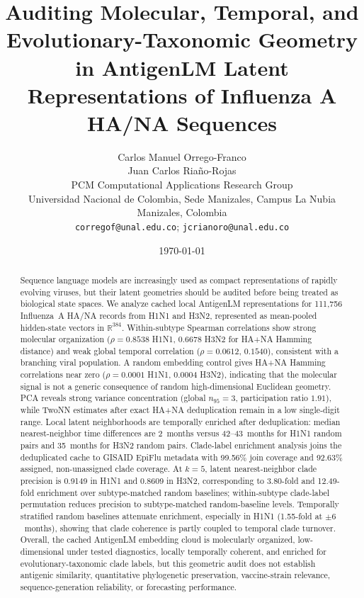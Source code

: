 \documentclass[11pt]{article}
\title{Auditing Molecular, Temporal, and Evolutionary-Taxonomic Geometry in AntigenLM Latent Representations of Influenza A HA/NA Sequences}
\author{
Carlos Manuel Orrego-Franco\\
Juan Carlos Riaño-Rojas\\
\vspace{0.4em}
\small PCM Computational Applications Research Group\\
\small Universidad Nacional de Colombia, Sede Manizales, Campus La Nubia\\
\small Manizales, Colombia\\
\small \texttt{corregof@unal.edu.co}; \texttt{jcrianoro@unal.edu.co}
}
\date{\today}
\newcommand{\R}{\mathbb{R}}
\begin{document}
\maketitle

\begin{abstract}
Sequence language models are increasingly used as compact representations
of rapidly evolving viruses, but their latent geometries should be audited
before being treated as biological state spaces. We analyze cached local
AntigenLM representations for 111,756 Influenza~A HA/NA records from H1N1
and H3N2, represented as mean-pooled hidden-state vectors in $\R^{384}$.
Within-subtype Spearman correlations show strong molecular organization
($\rho = 0.8538$ H1N1, $0.6678$ H3N2 for HA+NA Hamming distance) and
weak global temporal correlation ($\rho = 0.0612$, $0.1540$), consistent
with a branching viral population. A random embedding control gives HA+NA
Hamming correlations near zero ($\rho = 0.0001$ H1N1, $0.0004$ H3N2),
indicating that the molecular signal is not a generic consequence of random
high-dimensional Euclidean geometry. PCA reveals strong variance concentration
(global $n_{95} = 3$, participation ratio $1.91$), while TwoNN estimates
after exact HA+NA deduplication remain in a low single-digit range.
Local latent neighborhoods are temporally enriched after deduplication:
median nearest-neighbor time differences are 2~months versus 42--43~months
for H1N1 random pairs and 35~months for H3N2 random pairs.
Clade-label enrichment analysis joins the deduplicated cache to GISAID
EpiFlu metadata with 99.56\% join coverage and 92.63\% assigned,
non-unassigned clade coverage. At $k = 5$, latent nearest-neighbor clade
precision is 0.9149 in H1N1 and 0.8609 in H3N2, corresponding to
3.80-fold and 12.49-fold enrichment over subtype-matched random baselines;
within-subtype clade-label permutation reduces precision to subtype-matched random-baseline
levels. Temporally stratified random baselines attenuate enrichment,
especially in H1N1 (1.55-fold at $\pm 6$~months), showing that clade
coherence is partly coupled to temporal clade turnover. Overall, the
cached AntigenLM embedding cloud is molecularly organized, low-dimensional
under tested diagnostics, locally temporally coherent, and enriched for
evolutionary-taxonomic clade labels, but this geometric audit does not
establish antigenic similarity, quantitative phylogenetic preservation,
vaccine-strain relevance, sequence-generation reliability, or forecasting
performance.
\end{abstract}
\end{document}

